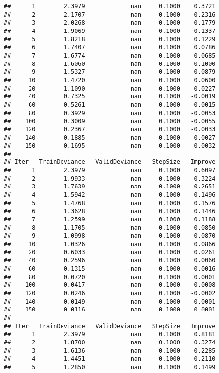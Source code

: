 \documentclass[]{article}
\begin{document}
\begin{verbatim}
##      1        2.3979             nan     0.1000    0.3721
##      2        2.1707             nan     0.1000    0.2316
##      3        2.0268             nan     0.1000    0.1779
##      4        1.9069             nan     0.1000    0.1337
##      5        1.8218             nan     0.1000    0.1229
##      6        1.7407             nan     0.1000    0.0786
##      7        1.6774             nan     0.1000    0.0685
##      8        1.6060             nan     0.1000    0.1000
##      9        1.5327             nan     0.1000    0.0879
##     10        1.4720             nan     0.1000    0.0600
##     20        1.1090             nan     0.1000    0.0227
##     40        0.7325             nan     0.1000   -0.0019
##     60        0.5261             nan     0.1000   -0.0015
##     80        0.3929             nan     0.1000   -0.0053
##    100        0.3009             nan     0.1000   -0.0055
##    120        0.2367             nan     0.1000   -0.0033
##    140        0.1885             nan     0.1000   -0.0027
##    150        0.1695             nan     0.1000   -0.0032
## 
## Iter   TrainDeviance   ValidDeviance   StepSize   Improve
##      1        2.3979             nan     0.1000    0.6097
##      2        1.9933             nan     0.1000    0.3224
##      3        1.7639             nan     0.1000    0.2651
##      4        1.5942             nan     0.1000    0.1496
##      5        1.4768             nan     0.1000    0.1576
##      6        1.3628             nan     0.1000    0.1446
##      7        1.2599             nan     0.1000    0.1188
##      8        1.1705             nan     0.1000    0.0850
##      9        1.0998             nan     0.1000    0.0870
##     10        1.0326             nan     0.1000    0.0866
##     20        0.6033             nan     0.1000    0.0261
##     40        0.2596             nan     0.1000    0.0060
##     60        0.1315             nan     0.1000    0.0016
##     80        0.0720             nan     0.1000    0.0001
##    100        0.0417             nan     0.1000   -0.0008
##    120        0.0246             nan     0.1000   -0.0002
##    140        0.0149             nan     0.1000   -0.0001
##    150        0.0116             nan     0.1000    0.0001
## 
## Iter   TrainDeviance   ValidDeviance   StepSize   Improve
##      1        2.3979             nan     0.1000    0.8181
##      2        1.8700             nan     0.1000    0.3274
##      3        1.6136             nan     0.1000    0.2285
##      4        1.4451             nan     0.1000    0.2110
##      5        1.2850             nan     0.1000    0.1499

\end{verbatim}
\end{document}
